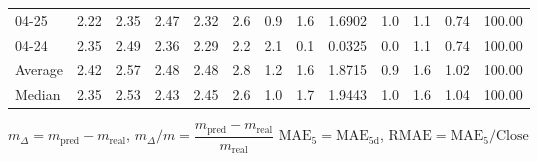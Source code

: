 \begin{threeparttable}
{\begin{tabular}{lrrrrrrrrrrrr}
  04-25 &          2.22 &          2.35 &          2.47 &        2.32 &                 2.6 &                 0.9 &        1.6 &       1.6902 &                 1.0 &              1.1 &            0.74 &                 100.00 \\
  04-24 &          2.35 &          2.49 &          2.36 &        2.29 &                 2.2 &                 2.1 &        0.1 &       0.0325 &                 0.0 &              1.1 &            0.74 &                 100.00 \\
Average &          2.42 &          2.57 &          2.48 &        2.48 &                 2.8 &                 1.2 &        1.6 &       1.8715 &                 0.9 &              1.6 &            1.02 &                 100.00 \\
 Median &          2.35 &          2.53 &          2.43 &        2.45 &                 2.6 &                 1.0 &        1.7 &       1.9443 &                 1.0 &              1.6 &            1.04 &                 100.00 \\
\bottomrule
\end{tabular}
}
\begin{tablenotes}\footnotesize
\item $m_\Delta=m_{\text{pred}}-m_{\text{real}}$,
$m_\Delta/m=\dfrac{m_{\text{pred}}-m_{\text{real}}}{m_{\text{real}}}$
$\mathrm{MAE}_5=\mathrm{MAE}_{5\text{d}}$,
$\mathrm{RMAE}=\mathrm{MAE}_5/\text{Close}$
\end{tablenotes}
\end{threeparttable}
\endgroup

